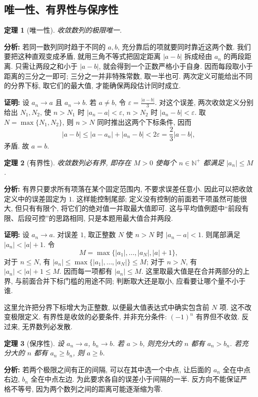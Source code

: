 \documentclass[UTF8,openany]{ctexbook}
\theoremstyle{chinesetextbook}
\newtheorem{theorem}{定理}[section]
\newenvironment{cnproof}{\par\indent\textbf{证明:} \ignorespaces}{\par}
\begin{document}
\subsection{唯一性、有界性与保序性}
\begin{theorem}[唯一性]
收敛数列的极限唯一.
\end{theorem}
\par\indent\textbf{分析:} 若同一数列同时趋于不同的 $a,b$, 充分靠后的项就要同时靠近这两个数. 我们要把这种直观变成矛盾, 就用三角不等式把固定距离 $|a-b|$ 拆成经由 $a_n$ 的两段距离. 只需让两段之和小于 $|a-b|$, 就会得到一个正数严格小于自身. 因而每段取小于距离的三分之一即可; 三分之一并非特殊常数, 取一半也可. 两次定义可能给出不同的分界下标, 取它们的最大值, 才能确保两段估计同时成立.
\begin{cnproof}
设 $a_n\to a$ 且 $a_n\to b$. 若 $a\ne b$, 令 $\displaystyle \varepsilon=\frac{|a-b|}{3}$. 对这个误差, 两次收敛定义分别给出 $N_1,N_2$, 使 $n>N_1$ 时 $|a_n-a|<\varepsilon$, $n>N_2$ 时 $|a_n-b|<\varepsilon$. 取 $N=\max\{N_1,N_2\}$, 则 $n>N$ 同时推出这两个下标条件, 因而
\[
|a-b|\le|a-a_n|+|a_n-b|<2\varepsilon=\frac23|a-b|,
\]
矛盾. 故 $a=b$.
\end{cnproof}
\begin{theorem}[有界性]
收敛数列必有界, 即存在 $M>0$ 使每个 $n\in\mathbb N^+$ 都满足 $|a_n|\le M$.
\end{theorem}
\par\indent\textbf{分析:} 有界只要求所有项落在某个固定范围内, 不要求误差任意小. 因此可以把收敛定义中的误差固定为 $1$. 这样能控制尾部; 定义没有控制的前面若干项虽然可能很大, 但只有有限个, 将它们的绝对值一并取最大值即可. 这与平均值例题中“前段有限、后段可控”的思路相同, 只是本题用最大值合并两段.


\begin{cnproof}
设 $a_n\to a$. 对误差 $1$, 取正整数 $N$ 使 $n>N$ 时 $|a_n-a|<1$. 则尾部满足 $|a_n|<|a|+1$. 令
\[
M=\max\{|a_1|,\ldots,|a_N|,|a|+1\},
\]
对于 $n\le N$, 有 $|a_n|\le\max\{|a_1|,\ldots,|a_N|\}\le M$; 对于 $n>N$, 有 $|a_n|<|a|+1\le M$. 因而每一项都有 $|a_n|\le M$. 这里取最大值是在合并两部分的上界, 与前面合并下标门槛的用途不同; 判断取大还是取小, 应看要让哪个量不小于谁.
\end{cnproof}
这里允许把分界下标增大为正整数, 以便最大值表达式中确实包含前 $N$ 项. 这不改变极限定义. 有界性是收敛的必要条件, 并非充分条件: $(-1)^n$ 有界但不收敛. 反过来, 无界数列必发散.
\begin{theorem}[保序性]
设 $a_n\to a$, $b_n\to b$. 若 $a>b$, 则充分大的 $n$ 都有 $a_n>b_n$. 若充分大的 $n$ 都有 $a_n\ge b_n$, 则 $a\ge b$.
\end{theorem}
\par\indent\textbf{分析:} 若两个极限之间有正的间隔, 可以在其中选一个中点, 让后面的 $a_n$ 全在中点右边, $b_n$ 全在中点左边. 为此要求各自的误差小于间隔的一半. 反方向不能保证严格不等号, 因为两个数列之间的距离可能逐渐缩为零.
\end{document}
